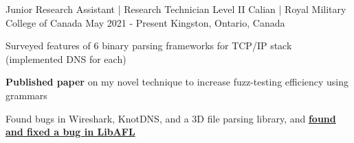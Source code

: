\begin{cventries}
  \cventry
    {Junior Research Assistant | Research Technician Level II} %
    {Calian | Royal Military College of Canada} %
    {May 2021 - Present} %
    {Kingston, Ontario, Canada} %
    {
      \begin{cvitems} %
        \item{Surveyed features of 6 binary parsing frameworks for TCP/IP stack (implemented DNS for each)}
        \item{\textbf{Published paper} on my novel technique to increase fuzz-testing efficiency using grammars}
        \item{Found bugs in Wireshark, KnotDNS, and a 3D file parsing library, and \textbf{\href{https://github.com/AFLplusplus/LibAFL/pull/1317}{found and fixed a bug in LibAFL}}}
      \end{cvitems}
    }


\end{cventries}
